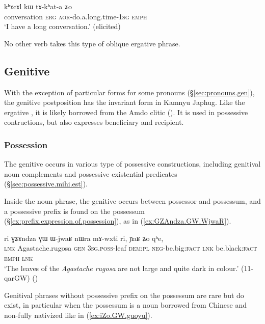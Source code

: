   \begin{exe}
\ex \label{ex:khAcAl.kW.takhata}
\gll kʰɤcɤl kɯ tɤ-kʰat-a ʑo \\
conversation \textsc{erg} \textsc{aor}-do.a.long.time-\textsc{1sg} \textsc{emph} \\
\glt `I have a long conversation.' (elicited)
\end{exe}

No other verb takes this type of oblique ergative phrase.

\subsection{Genitive} \label{sec:genitive}
With the exception of particular forms for some pronouns (§\ref{sec:pronouns.gen}), the genitive postposition has the invariant form  in Kamnyu Japhug. Like the ergative , it is likely borrowed from the Amdo clitic  (\citealt[62]{haller04themchen}). It is used in possessive contructions, but also expresses beneficiary and recipient.

\subsubsection{Possession} \label{sec:gen.possession}
The genitive  occurs in various type of possessive constructions, including genitival noun complements and possessive existential predicates (§\ref{sec:possessive.mihi.est}).

Inside the noun phrase, the genitive occurs between possessor and possessum, and a possessive prefix is found on the possessum (§\ref{ex:prefix.expression.of.possession}), as in (\ref{ex:GZAndza.GW.WjwaR}).  

\begin{exe}
\ex \label{ex:GZAndza.GW.WjwaR}
\gll ri ɣʑɤndza ɣɯ ɯ-jwaʁ nɯra mɤ-wxti ri, ɲaʁ ʑo qʰe, \\
\textsc{lnk} Agastache.rugosa \textsc{gen} \textsc{3sg}.\textsc{poss}-leaf \textsc{dem}:\textsc{pl} \textsc{neg}-be.big:\textsc{fact} \textsc{lnk} be.black:\textsc{fact} \textsc{emph} \textsc{lnk} \\
\glt `The leaves of the \textit{Agastache rugosa} are not large and quite dark in colour.' (11-qarGW)
()
\end{exe}

Genitival phrases without possessive prefix on the possessum are rare but do exist, in particular when the possessum is a noun borrowed from Chinese and non-fully nativized like  in (\ref{ex:iZo.GW.guoyu}).  


